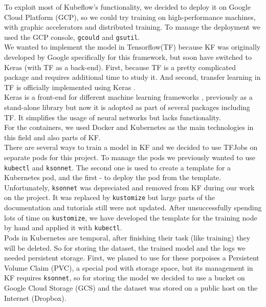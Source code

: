\documentclass[
	12pt, %
]{fphw}
\begin{document}
To exploit most of Kubeflow's functionality, we decided to deploy it on Google Cloud Platform (GCP), so we could try training on high-performance machines, with graphic accelerators and distributed training. To manage the deployment we used the GCP console, \verb|gcould| and \verb|gsutil|.\\

We wanted to implement the model in Tensorflow(TF) because KF was originally developed by Google specifically for this framework, but soon have switched to Keras (with TF as a back-end). First, because TF is a pretty complicated package and requires additional time to study it. And second, transfer learning in TF is officially implemented using Keras \cite{tf}.\\

Keras is a front-end for different machine learning frameworks \cite{keras}, previously as a stand-alone library but now it is adopted as part of several packages including TF. It simplifies the usage of neural networks but lacks functionality.\\

For the containers, we used Docker and Kubernetes as the main technologies in this field and also parts of KF. \\

There are several ways to train a model in KF and we decided to use TFJobs on separate pods for this project. To manage the pods we previously wanted to use \verb|kubectl| and \verb|ksonnet|. The second one is used to create a template for a Kubernetes pod, and the first - to deploy the pod from the template. Unfortunately, \verb|ksonnet| was depreciated and removed from KF during our work on the project. It was replaced by \verb|kustomize| but large parts of the documentation and tutorials still were not updated. After unsuccessfully spending lots of time on \verb|kustomize|, we have developed the template for the training node by hand and applied it with \verb|kubectl|.\\

Pods in Kubernetes are temporal, after finishing their task (like training) they will be deleted. So for storing the dataset, the trained model and the logs we needed persistent storage. First, we planed to use for these porpoises a Persistent Volume Claim (PVC), a special pod with storage space, but its management in KF requires \verb|ksonnet|, so for storing the model we decided to use a bucket on Google Cloud Storage (GCS) and the dataset was stored on a public host on the Internet (Dropbox).\\
\end{document}
